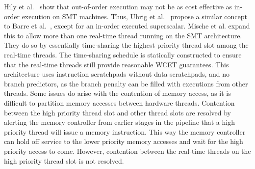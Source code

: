 Hily et al.~\cite{Hily1999} show that out-of-order execution may not be as cost effective as in-order execution on SMT machines.
Thus, Uhrig et al.~\cite{SaschaUhrig2005SMT} propose a similar concept to Barre et al.~\cite{Barre2008RTSMT}, except for an in-order executed superscalar.
Mische et al.\cite{Mische2008SMT} expand this to allow more than one real-time thread running on the SMT architecture.
They do so by essentially time-sharing the highest priority thread slot among the real-time threads.  
The time-sharing schedule is statically constructed to ensure that the real-time threads still provide reasonable WCET guarantees. 
This architecture uses instruction scratchpads without data scratchpads, and no branch predictors, as the branch penalty can be filled with executions from other threads.   
Some issues do arise with the contention of memory access, as it is difficult to partition memory accesses between hardware threads.
Contention between the high priority thread slot and other thread slots are resolved by alerting the memory controller from earlier stages in the pipeline that a high priority thread will issue a memory instruction. 
This way the memory controller can hold off service to the lower priority memory accesses and wait for the high priority access to come.     
However, contention between the real-time threads on the high priority thread slot is not resolved. 
 

